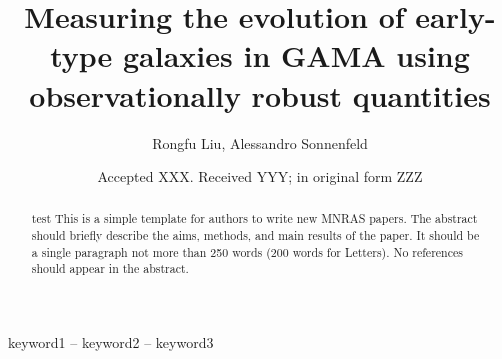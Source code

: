 \documentclass[fleqn,usenatbib]{mnras}
\title[Short title, max. 45 characters]{Measuring the evolution of early-type galaxies in GAMA using observationally robust  quantities}
\author[Rongfu Liu et al.]{
Rongfu Liu, Alessandro Sonnenfeld
}
\date{Accepted XXX. Received YYY; in original form ZZZ}
\begin{document}
\label{firstpage}
\pagerange{\pageref{firstpage}--\pageref{lastpage}}
\maketitle

\begin{abstract}
test This is a simple template for authors to write new MNRAS papers.
The abstract should briefly describe the aims, methods, and main results of the paper.
It should be a single paragraph not more than 250 words (200 words for Letters).
No references should appear in the abstract.
\end{abstract}

\begin{keywords}
keyword1 -- keyword2 -- keyword3
\end{keywords}


\end{document}
